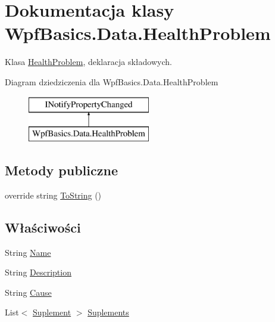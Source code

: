 \hypertarget{class_wpf_basics_1_1_data_1_1_health_problem}{}\section{Dokumentacja klasy Wpf\+Basics.\+Data.\+Health\+Problem}
\label{class_wpf_basics_1_1_data_1_1_health_problem}


Klasa \hyperlink{class_wpf_basics_1_1_data_1_1_health_problem}{Health\+Problem}, deklaracja składowych.  


Diagram dziedziczenia dla Wpf\+Basics.\+Data.\+Health\+Problem\begin{figure}[H]
\begin{center}
\leavevmode
\includegraphics[height=2.000000cm]{class_wpf_basics_1_1_data_1_1_health_problem}
\end{center}
\end{figure}
\subsection*{Metody publiczne}
\begin{DoxyCompactItemize}
\item 
override string \hyperlink{class_wpf_basics_1_1_data_1_1_health_problem_af0aa53844c1f023b9653b789a6a5636a}{To\+String} ()
\end{DoxyCompactItemize}
\subsection*{Właściwości}
\begin{DoxyCompactItemize}
\item 
String \hyperlink{class_wpf_basics_1_1_data_1_1_health_problem_af5f105578193c56e096803bdc26eac8f}{Name}
\item 
String \hyperlink{class_wpf_basics_1_1_data_1_1_health_problem_a388d29276908852b554ff5afac509640}{Description}
\item 
String \hyperlink{class_wpf_basics_1_1_data_1_1_health_problem_a49960c2c156d8143d6b07e21467e8794}{Cause}
\item 
List$<$ \hyperlink{class_wpf_basics_1_1_data_1_1_suplement}{Suplement} $>$ \hyperlink{class_wpf_basics_1_1_data_1_1_health_problem_af68e23b91811f240ec3c6e53dd5ed680}{Suplements}
\end{DoxyCompactItemize}
